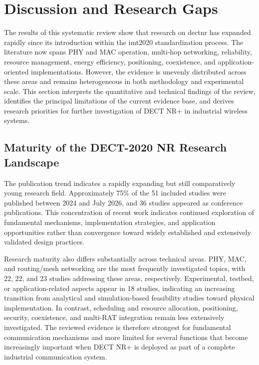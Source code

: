 \section{Discussion and Research Gaps}
\label{sec:discussion}

The results of this systematic review show that research on \gls{dectnr} has
expanded rapidly since its introduction within the \gls{imt2020}
standardization process. The literature now spans PHY and MAC operation,
multi-hop networking, reliability, resource management, energy efficiency,
positioning, coexistence, and application-oriented implementations. However,
the evidence is unevenly distributed across these areas and remains
heterogeneous in both methodology and experimental scale. This section
interprets the quantitative and technical findings of the review, identifies
the principal limitations of the current evidence base, and derives research
priorities for further investigation of DECT NR+ in industrial wireless
systems.


\subsection{Maturity of the DECT-2020 NR Research Landscape}
\label{subsec:research_maturity}

The publication trend indicates a rapidly expanding but still comparatively
young research field. Approximately 75\% of the 51 included studies were
published between 2024 and July 2026, and 36 studies appeared as conference
publications. This concentration of recent work indicates continued
exploration of fundamental mechanisms, implementation strategies, and
application opportunities rather than convergence toward widely established
and extensively validated design practices.

Research maturity also differs substantially across technical areas. PHY, MAC,
and routing/mesh networking are the most frequently investigated topics, with
22, 22, and 23 studies addressing these areas, respectively. Experimental,
testbed, or application-related aspects appear in 18 studies, indicating an
increasing transition from analytical and simulation-based feasibility studies
toward physical implementation. In contrast, scheduling and resource
allocation, positioning, security, coexistence, and multi-RAT integration
remain less extensively investigated. The reviewed evidence is therefore
strongest for fundamental communication mechanisms and more limited for
several functions that become increasingly important when DECT NR+ is deployed
as part of a complete industrial communication system.

